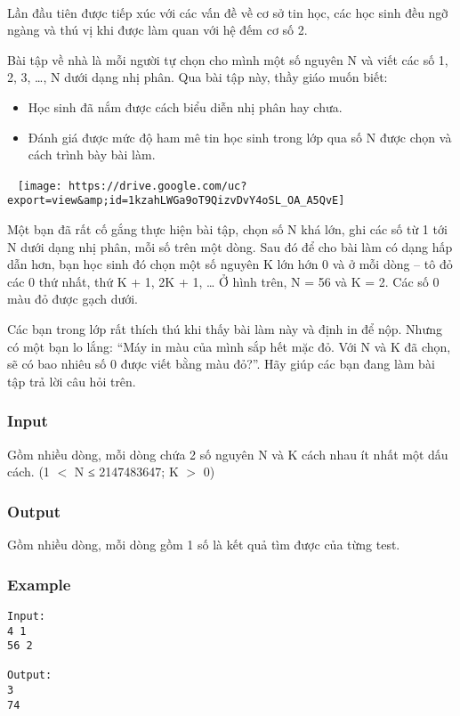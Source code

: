 

 

Lần đầu tiên được tiếp xúc với các vấn đề về cơ sở tin học, các học sinh đều ngỡ ngàng và thú vị khi được làm quan với hệ đếm cơ số 2.

Bài tập về nhà là mỗi người tự chọn cho mình một số nguyên N và viết các số 1, 2, 3, …, N dưới dạng nhị phân. Qua bài tập này, thầy giáo muốn biết:
\begin{itemize}
	\item Học sinh đã nắm được cách biểu diễn nhị phân hay chưa.
	\item Đánh giá được mức độ ham mê tin học sinh trong lớp qua số N được chọn và cách trình bày bài làm.
\end{itemize}

 
\texttt{[image: https://drive.google.com/uc?export=view\&amp;id=1kzahLWGa9oT9QizvDvY4oSL\_OA\_A5QvE]}

Một bạn đã rất cố gắng thực hiện bài tập, chọn số N khá lớn, ghi các số từ 1 tới N dưới dạng nhị phân, mỗi số trên một dòng. Sau đó để cho bài làm có dạng hấp dẫn hơn, bạn học sinh đó chọn một số nguyên K lớn hớn 0 và ở mỗi dòng – tô đỏ các 0 thứ nhất, thứ K + 1, 2K + 1, … Ở hình trên, N = 56 và K = 2. Các số 0 màu đỏ được gạch dưới.

Các bạn trong lớp rất thích thú khi thấy bài làm này và định in để nộp. Nhưng có một bạn lo lắng: “Máy in màu của mình sắp hết mặc đỏ. Với N và K đã chọn, sẽ có bao nhiêu số 0 được viết bằng màu đỏ?”. Hãy giúp các bạn đang làm bài tập trả lời câu hỏi trên.

\subsubsection{Input}

Gồm nhiều dòng, mỗi dòng chứa 2 số nguyên N và K cách nhau ít nhất một dấu cách. (1 $<$ N ≤ 2147483647; K $>$ 0)

\subsubsection{Output}

Gồm nhiều dòng, mỗi dòng gồm 1 số là kết quả tìm được của từng test.

\subsubsection{Example}
\begin{verbatim}
Input:
4 1
56 2

Output:
3
74
\end{verbatim}